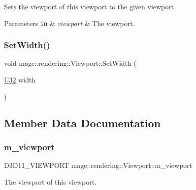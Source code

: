 Sets the viewport of this viewport to the given viewport.


\begin{DoxyParams}[1]{Parameters}
\mbox{\tt in}  & {\em viewport} & The viewport. \\
\hline
\end{DoxyParams}
\hypertarget{classmage_1_1rendering_1_1_viewport_abe04695a284b6a00e2f585c0fe7f6e90}{}\label{classmage_1_1rendering_1_1_viewport_abe04695a284b6a00e2f585c0fe7f6e90} 
\subsubsection{\texorpdfstring{Set\+Width()}{SetWidth()}}
{\footnotesize\ttfamily void mage\+::rendering\+::\+Viewport\+::\+Set\+Width (\begin{DoxyParamCaption}\item[{\hyperlink{namespacemage_a41c104c036fba3756a74e19f793eeaa1}{U32}}]{width }\end{DoxyParamCaption})\hspace{0.3cm}{\ttfamily [noexcept]}}



\subsection{Member Data Documentation}
\hypertarget{classmage_1_1rendering_1_1_viewport_ab0b20f21a771248d9e9659f1029a497d}{}\label{classmage_1_1rendering_1_1_viewport_ab0b20f21a771248d9e9659f1029a497d} 
\subsubsection{\texorpdfstring{m\+\_\+viewport}{m\_viewport}}
{\footnotesize\ttfamily D3\+D11\+\_\+\+V\+I\+E\+W\+P\+O\+RT mage\+::rendering\+::\+Viewport\+::m\+\_\+viewport\hspace{0.3cm}{\ttfamily [private]}}

The viewport of this viewport. 